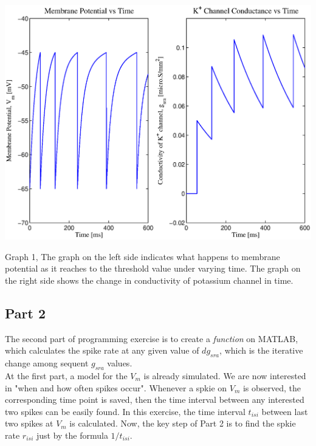\documentclass{article}
\begin{document}
\begin{center}
 \includegraphics[width=\textwidth]{fig1.eps}
\begin{footnotesize}Graph 1, The graph on the left side indicates what happens to membrane potential as it reaches to the threshold value under varying time. The graph on the right side shows the change in conductivity of potassium channel in time.\end{footnotesize}
\end{center}

\begin{center}
\section*{Part 2} 
\end{center}

The second part of programming exercise is to create a \textit{function} on MATLAB, which calculates the spike rate at any given value of $dg_{sra}$, which is the iterative change among sequent $g_{sra}$ values. \\

At the first part, a model for the $V_{m}$ is already simulated. We are now interested in "when and how often spikes occur". Whenever a spkie on $V_{m}$ is observed, the corresponding time point is saved, then the time interval between any interested two spikes can be easily found. In this exercise, the time interval $t_{isi}$ between last two spikes at $V_{m}$ is calculated. Now, the key step of Part 2 is to find the spkie rate $r_{isi}$ just by the formula $1/t_{isi}.$ \\
\end{document}
